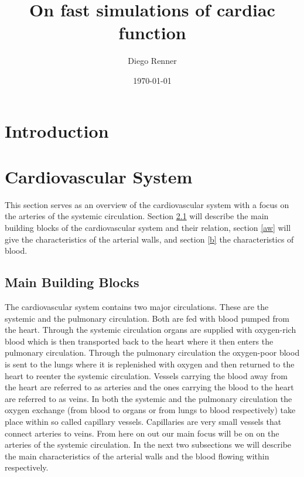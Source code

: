 \documentclass[a4paper, oneside]{discothesis}
\title{On fast simulations of cardiac function}
\author{Diego Renner}
\institute{Dep. of Mathematics \\[2pt]
ETH Zürich}
\date{\today}
\begin{document}
\frontmatter %
\maketitle
\cleardoublepage

\begin{acknowledgements}
	
\end{acknowledgements}


\begin{abstract}
	
\end{abstract}

\tableofcontents

\mainmatter %

\chapter{Introduction}
\chapter{Cardiovascular System}
This section serves as an overview of the cardiovascular system with a focus on the arteries of the systemic circulation. 
Section \ref{mbb} will describe the main building blocks of the cardiovascular system and their relation, section \ref{aw} will give the characteristics of the arterial walls, and section \ref{b} the characteristics of blood.
\section{Main Building Blocks} \label{mbb}
The cardiovascular system contains two major circulations.
These are the systemic and the pulmonary circulation. 
Both are fed with blood pumped from the heart.
Through the systemic circulation organs are supplied with oxygen-rich blood which is then transported back to the heart where it then enters the pulmonary circulation.
Through the pulmonary circulation the oxygen-poor blood is sent to the lungs where it is replenished with oxygen and then returned to the heart to reenter the systemic circulation.
Vessels carrying the blood away from the heart are referred to as arteries and the ones carrying the blood to the heart are referred to as veins.
In both the systemic and the pulmonary circulation the oxygen exchange (from blood to organs or from lungs to blood respectively) take place within so called capillary vessels.
Capillaries are very small vessels that connect arteries to veins.
From here on out our main focus will be on on the arteries of the systemic circulation. 
In the next two subsections we will describe the main characteristics of the arterial walls and the blood flowing within respectively.
\end{document}
